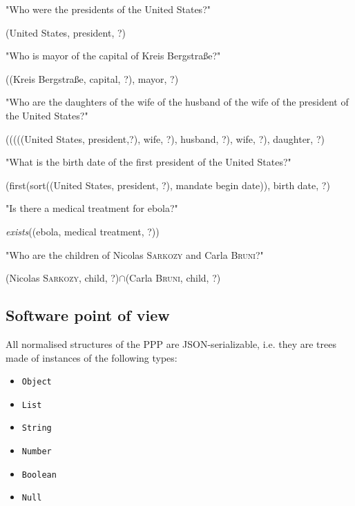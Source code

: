 \bigskip

"Who were the presidents of the United States?"
\begin{center}(United States, president, ?)\end{center}

\bigskip

"Who is mayor of the capital of Kreis Bergstraße?"
\begin{center}((Kreis Bergstraße, capital, ?), mayor, ?)\end{center}

\bigskip

"Who are the daughters of the wife of the husband of the wife of the president of the United States?"
\begin{center}
(((((United States, president,?), wife, ?), husband, ?), wife, ?), daughter, ?)
\end{center}

\bigskip

"What is the birth date of the first president of the United States?"
\begin{center}(first(sort((United States, president, ?), mandate begin date)), birth date, ?)\end{center}

\bigskip

"Is there a medical treatment for ebola?"
\begin{center}\textsl{exists}((ebola, medical treatment, ?))\end{center}

\bigskip

"Who are the children of Nicolas \textsc{Sarkozy} and Carla \textsc{Bruni}?"
\begin{center}(Nicolas \textsc{Sarkozy}, child, ?)$\cap$(Carla \textsc{Bruni}, child, ?)\end{center}

\subsection{Software point of view}

All normalised structures of the PPP are JSON-serializable, i.e. they are trees made of instances of the following types:
\begin{itemize}
    \item \texttt{Object}
    \item \texttt{List}
    \item \texttt{String}
    \item \texttt{Number}
    \item \texttt{Boolean}
    \item \texttt{Null}
\end{itemize}

